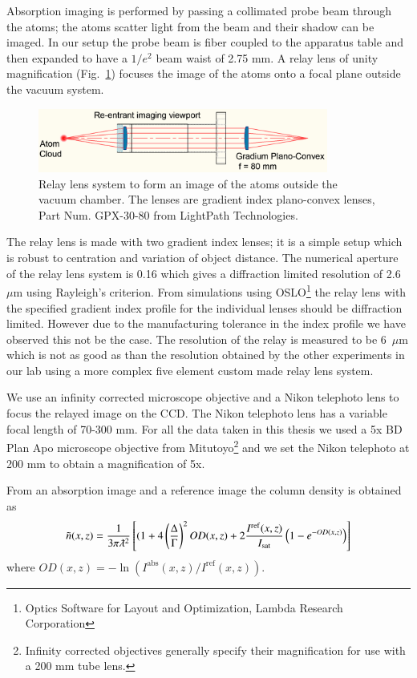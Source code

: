 \documentclass[oneside,12pt]{memoir}
\newcommand{\isat}{ \ensuremath{ I_{\mathrm{sat}} } }
\begin{document}
Absorption imaging is performed by passing a collimated probe beam through the
atoms; the atoms scatter light from the beam and their shadow can be imaged.
In our setup the probe beam is fiber coupled to the apparatus table and then
expanded to have a $1/e^{2}$ beam waist of 2.75 mm.   A relay lens of unity
magnification (Fig.~\ref{fig:relaylens}) focuses the image of the atoms onto a
focal plane outside the vacuum system.  \begin{figure} \centering
\includegraphics[width=0.85\textwidth]{../figures/imaging/relay.pdf}
\caption[Relay lens system]{\small  Relay lens system to form an image of the
atoms outside the vacuum chamber.  The lenses are gradient index plano-convex
lenses, Part Num. GPX-30-80 from LightPath Technologies. }
\label{fig:relaylens} \end{figure} The relay lens is made with  two gradient
index lenses; it is a simple setup which is robust to centration and variation
of object distance.     The numerical aperture of the relay lens system is 0.16
which gives a diffraction limited resolution of 2.6~$\mu$m using Rayleigh's
criterion.   From simulations using OSLO\footnote{Optics Software for Layout
and Optimization, Lambda Research Corporation} the relay lens with the
specified gradient index profile for the individual lenses should be
diffraction limited.  However due to the manufacturing tolerance in the index
profile we have observed this not be the case.  The resolution of the relay is
measured to be 6~$\mu$m which is not as good as than the resolution obtained by
the other experiments in our lab using a more complex five element custom made
relay lens system.

We use an infinity corrected microscope objective and a Nikon telephoto lens to
focus the relayed image on the CCD.  The Nikon telephoto lens has a variable
focal length of 70-300 mm.     For all the data taken in this thesis we used a
5x BD Plan Apo microscope objective from Mitutoyo\footnote{Infinity corrected
objectives generally specify their magnification for use with a 200 mm tube
lens. } and we set the Nikon telephoto at 200 mm to obtain a magnification of
5x. 

From an absorption image and a reference image  the column density is
obtained~\cite{Ramsey2006} as \[ \tilde{n}(x,z) = \frac{1}{3\pi\lambdabar^{2}}
\left[ ( 1+ 4\left(\frac{\Delta}{\Gamma}\right)^{2} OD(x,z) + 2
\frac{I^{\mathrm{ref}}(x,z)}{\isat} \left( 1 - e^{-OD(x,z)}\right) \right] \]
where $OD(x,z) = -\ln ( I^{\mathrm{abs}}(x,z) / I^{\mathrm{ref}}(x,z)) $.
\end{document}
